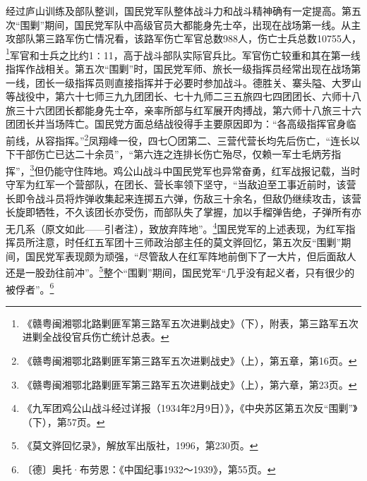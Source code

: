 经过庐山训练及部队整训，国民党军队整体战斗力和战斗精神确有一定提高。第五次“围剿”期间，国民党军队中高级官员大都能身先士卒，出现在战场第一线。从主攻部队第三路军伤亡情况看，该路军伤亡军官总数988人，伤亡士兵总数10755人，\footnote{《赣粤闽湘鄂北路剿匪军第三路军五次进剿战史》（下），附表，第三路军五次进剿全战役官兵伤亡统计总表。}军官和士兵之比约1∶11，高于战斗部队实际官兵比。军官伤亡较重和其在第一线指挥作战相关。第五次“围剿”时，国民党军师、旅长一级指挥员经常出现在战场第一线，团长一级指挥员则直接指挥并于必要时参加战斗。德胜关、寨头隘、大罗山等战役中，第六十七师三九九团团长、七十九师二三五旅四七四团团长、六师十八旅三十六团团长都能身先士卒，亲率所部与红军展开肉搏战，第六师十八旅三十六团团长并当场阵亡。国民党方面总结战役得手主要原因即为：“各高级指挥官身临前线，从容指挥。”\footnote{《赣粤闽湘鄂北路剿匪军第三路军五次进剿战史》（上），第五章，第16页。}凤翔峰一役，四七〇团第二、三营代营长均先后伤亡，“连长以下干部伤亡已达二十余员”，“第六连之连排长伤亡殆尽，仅赖一军士毛炳芳指挥”，\footnote{《赣粤闽湘鄂北路剿匪军第三路军五次进剿战史》（上），第六章，第23页。}但仍能守住阵地。鸡公山战斗中国民党军也异常奋勇，红军战报记载，当时守军为红军一个营部队，在团长、营长率领下坚守，“当敌迫至工事近前时，该营长即令战斗员将炸弹收集起来连掷五六弹，伤敌三十余名，但敌仍继续攻击，该营长旋即牺牲，不久该团长亦受伤，而部队失了掌握，加以手榴弹告绝，子弹所有亦无几系（原文如此——引者注），致放弃阵地”。\footnote{《九军团鸡公山战斗经过详报（1934年2月9日）》，《中央苏区第五次反“围剿”》（下），第57页。}国民党军的上述表现，为红军指挥员所注意，时任红五军团十三师政治部主任的莫文骅回忆，第五次反“围剿”期间，国民党军表现颇为顽强，“尽管敌人在红军阵地前倒下了一大片，但后面敌人还是一股劲往前冲”。\footnote{《莫文骅回忆录》，解放军出版社，1996，第230页。}整个“围剿”期间，国民党军“几乎没有起义者，只有很少的被俘者”。\footnote{〔德〕奥托·布劳恩：《中国纪事1932～1939》，第55页。}


